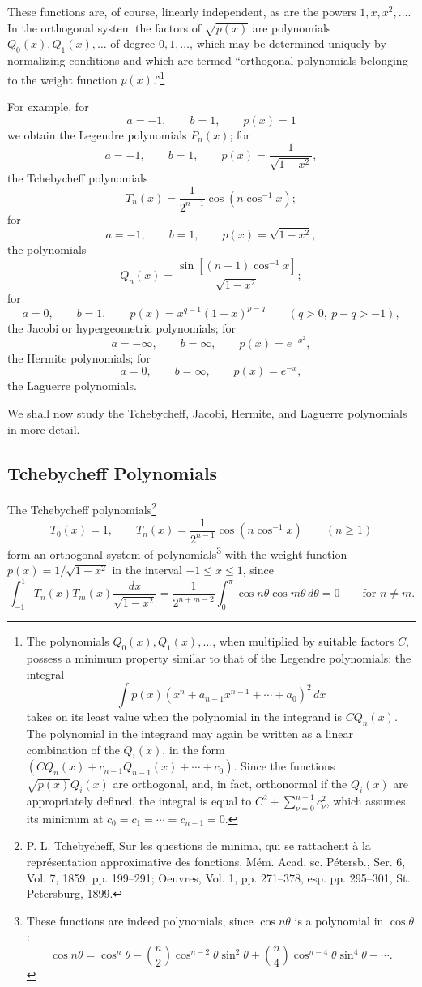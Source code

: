 These functions are, of course, linearly independent, as are the powers $1,x,x^2,\ldots$. In the orthogonal system the factors of $\sqrt{p(x)}$ are polynomials $Q_0(x),Q_1(x),\ldots$ of degree $0,1,\ldots$, which may be determined uniquely by normalizing conditions and which are termed ``orthogonal polynomials belonging to the weight function $p(x)$.''\footnote{The polynomials $Q_0(x),Q_1(x),\ldots$, when multiplied by suitable factors $C$, possess a minimum property similar to that of the Legendre polynomials: the integral
\[
\int p(x)(x^n+a_{n-1}x^{n-1}+\cdots+a_0)^2\,dx
\]
takes on its least value when the polynomial in the integrand is $CQ_n(x)$. The polynomial in the integrand may again be written as a linear combination of the $Q_i(x)$, in the form $(CQ_n(x)+c_{n-1}Q_{n-1}(x)+\cdots+c_0)$. Since the functions $\sqrt{p(x)}Q_i(x)$ are orthogonal, and, in fact, orthonormal if the $Q_i(x)$ are appropriately defined, the integral is equal to $C^2+\sum_{\nu=0}^{n-1}c_\nu^2$, which assumes its minimum at $c_0=c_1=\cdots=c_{n-1}=0$.}

For example, for
\[
a=-1,\qquad b=1,\qquad p(x)=1
\]
we obtain the Legendre polynomials $P_n(x)$; for
\[
a=-1,\qquad b=1,\qquad p(x)=\frac{1}{\sqrt{1-x^2}},
\]
the Tchebycheff polynomials
\[
T_n(x)=\frac{1}{2^{n-1}}\cos(n\cos^{-1}x);
\]
for
\[
a=-1,\qquad b=1,\qquad p(x)=\sqrt{1-x^2},
\]
the polynomials
\[
Q_n(x)=\frac{\sin[(n+1)\cos^{-1}x]}{\sqrt{1-x^2}};
\]
for
\[
a=0,\qquad b=1,\qquad p(x)=x^{q-1}(1-x)^{p-q}\qquad(q>0,\ p-q>-1),
\]
the Jacobi or hypergeometric polynomials; for
\[
a=-\infty,\qquad b=\infty,\qquad p(x)=e^{-x^2},
\]
the Hermite polynomials; for
\[
a=0,\qquad b=\infty,\qquad p(x)=e^{-x},
\]
the Laguerre polynomials.

We shall now study the Tchebycheff, Jacobi, Hermite, and Laguerre polynomials in more detail.

\subsection{Tchebycheff Polynomials}
The Tchebycheff polynomials\footnote{P. L. Tchebycheff, Sur les questions de minima, qui se rattachent \`a la repr\'esentation approximative des fonctions, M\'em. Acad. sc. P\'etersb., Ser. 6, Vol. 7, 1859, pp. 199--291; Oeuvres, Vol. 1, pp. 271--378, esp. pp. 295--301, St. Petersburg, 1899.}
\[
T_0(x)=1,\qquad T_n(x)=\frac{1}{2^{n-1}}\cos(n\cos^{-1}x)\qquad(n\ge1)
\]
form an orthogonal system of polynomials\footnote{These functions are indeed polynomials, since $\cos n\theta$ is a polynomial in $\cos\theta$:
\[
\cos n\theta=\cos^n\theta-\binom n2\cos^{n-2}\theta\sin^2\theta+\binom n4\cos^{n-4}\theta\sin^4\theta-\cdots.
\]} with the weight function $p(x)=1/\sqrt{1-x^2}$ in the interval $-1\le x\le1$, since
\[
\int_{-1}^{1}T_n(x)T_m(x)\frac{dx}{\sqrt{1-x^2}}
=\frac{1}{2^{n+m-2}}\int_0^\pi\cos n\theta\cos m\theta\,d\theta=0
\qquad\text{for }n\ne m.
\]

